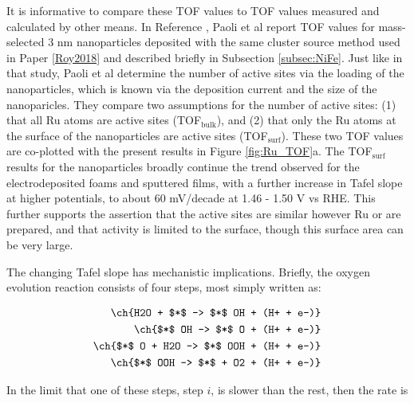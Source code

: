 It is informative to compare these TOF values to TOF values measured and calculated by other means. In Reference , Paoli et al report TOF values for mass-selected 3 nm  nanoparticles deposited with the same cluster source method used in Paper \ref{Roy2018} and described briefly in Subsection \ref{subsec:NiFe}. Just like in that study, Paoli et al determine the number of active sites via the loading of the nanoparticles, which is known via the deposition current and the size of the nanoparicles. They compare two assumptions for the number of active sites: (1) that all Ru atoms are active sites (TOF$_{\text{bulk}}$), and (2) that only the Ru atoms at the surface of the  nanoparticles are active sites  (TOF$_{\text{surf}}$). These two TOF values are co-plotted with the present results in Figure \ref{fig:Ru_TOF}a. The TOF$_{\text{surf}}$ results for the nanoparticles broadly continue the trend observed for the electrodeposited foams and sputtered films, with a further increase in Tafel slope at higher potentials, to about 60 mV/decade at 1.46 - 1.50 V vs RHE. This further supports the assertion that the active sites are similar however Ru or  are prepared, and that activity is limited to the surface, though this surface area can be very large.

The changing Tafel slope has mechanistic implications\cite{Shinagawa2015}. Briefly, the oxygen evolution reaction consists of four steps, most simply written as\cite{Man2011, Busch2016}:

\begin{align}
\ch{H2O + $*$ -> $*$ OH + (H+ + e-)}\label{rxn:OER_s1}\\
\ch{$*$ OH -> $*$ O + (H+ + e-)}\label{rxn:OER_s2}\\
\ch{$*$ O + H2O -> $*$ OOH + (H+ + e-)}\label{rxn:OER_s3}\\
\ch{$*$ OOH -> $*$ + O2 + (H+ + e-)}\label{rxn:OER_s4}
\end{align}

In the limit that one of these steps, step $i$, is slower than the rest, then the rate is

